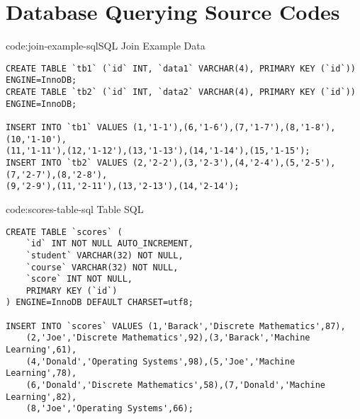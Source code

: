 \section{Database Querying Source Codes}\label{sect:database-querying-codes}

\begin{codeenv}{code:join-example-sql}{SQL Join Example Data}\begin{verbatim}
CREATE TABLE `tb1` (`id` INT, `data1` VARCHAR(4), PRIMARY KEY (`id`)) ENGINE=InnoDB;
CREATE TABLE `tb2` (`id` INT, `data2` VARCHAR(4), PRIMARY KEY (`id`)) ENGINE=InnoDB;

INSERT INTO `tb1` VALUES (1,'1-1'),(6,'1-6'),(7,'1-7'),(8,'1-8'),(10,'1-10'),
(11,'1-11'),(12,'1-12'),(13,'1-13'),(14,'1-14'),(15,'1-15');
INSERT INTO `tb2` VALUES (2,'2-2'),(3,'2-3'),(4,'2-4'),(5,'2-5'),(7,'2-7'),(8,'2-8'),
(9,'2-9'),(11,'2-11'),(13,'2-13'),(14,'2-14');
\end{verbatim}
\end{codeenv}

\begin{codeenv}{code:scores-table-sql}{ Table SQL}\begin{verbatim}
CREATE TABLE `scores` (
    `id` INT NOT NULL AUTO_INCREMENT,
    `student` VARCHAR(32) NOT NULL,
    `course` VARCHAR(32) NOT NULL,
    `score` INT NOT NULL,
    PRIMARY KEY (`id`)
) ENGINE=InnoDB DEFAULT CHARSET=utf8;

INSERT INTO `scores` VALUES (1,'Barack','Discrete Mathematics',87),
    (2,'Joe','Discrete Mathematics',92),(3,'Barack','Machine Learning',61),
    (4,'Donald','Operating Systems',98),(5,'Joe','Machine Learning',78),
    (6,'Donald','Discrete Mathematics',58),(7,'Donald','Machine Learning',82),
    (8,'Joe','Operating Systems',66);
\end{verbatim}
\end{codeenv}
